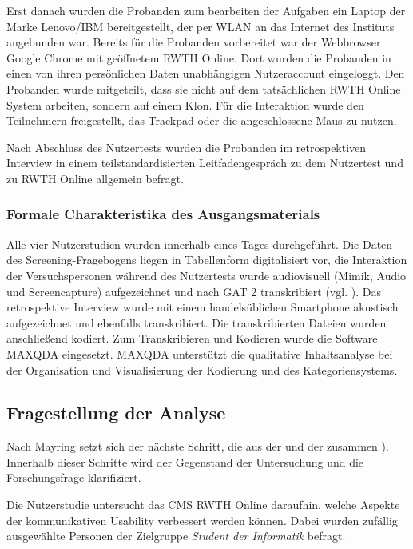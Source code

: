 Erst danach wurden die Probanden zum bearbeiten der Aufgaben ein Laptop der Marke Lenovo/IBM bereitgestellt, der per WLAN an das Internet des Instituts angebunden war. Bereits für die Probanden vorbereitet war der Webbrowser Google Chrome mit geöffnetem RWTH Online. Dort wurden die Probanden in einen von ihren persönlichen Daten unabhängigen Nutzeraccount eingeloggt. Den Probanden wurde mitgeteilt, dass sie nicht auf dem tatsächlichen RWTH Online System arbeiten, sondern auf einem Klon. Für die Interaktion wurde den Teilnehmern freigestellt, das Trackpad oder die angeschlossene Maus zu nutzen. 

Nach Abschluss des Nutzertests wurden die Probanden im retrospektiven Interview in einem teilstandardisierten Leitfadengespräch zu dem Nutzertest und zu RWTH Online allgemein befragt. 

\subsubsection*{Formale Charakteristika des Ausgangsmaterials}
Alle vier Nutzerstudien wurden innerhalb eines Tages durchgeführt. Die Daten des Screening-Fragebogens liegen in Tabellenform digitalisiert vor, die Interaktion der Versuchspersonen während des Nutzertests wurde audiovisuell (Mimik, Audio und Screencapture) aufgezeichnet und nach GAT 2 transkribiert (vgl. \cite{selting1998gesprachsanalytisches}). Das retrospektive Interview wurde mit einem handelsüblichen Smartphone akustisch aufgezeichnet und ebenfalls transkribiert. Die transkribierten Dateien wurden anschließend kodiert. Zum Transkribieren und Kodieren wurde die Software MAXQDA eingesetzt. MAXQDA unterstützt die qualitative Inhaltsanalyse bei der Organisation und Visualisierung der Kodierung und des Kategoriensystems.

\subsection{Fragestellung der Analyse}
Nach Mayring setzt sich der nächste Schritt, die  aus der  und der  zusammen \cite[53]{mayring2010qualitative}). Innerhalb dieser Schritte wird der Gegenstand der Untersuchung und die Forschungsfrage klarifiziert.

Die Nutzerstudie untersucht das CMS RWTH Online daraufhin, welche Aspekte der kommunikativen Usability verbessert werden können. Dabei wurden zufällig ausgewählte Personen der Zielgruppe \textit{Student der Informatik} befragt.

